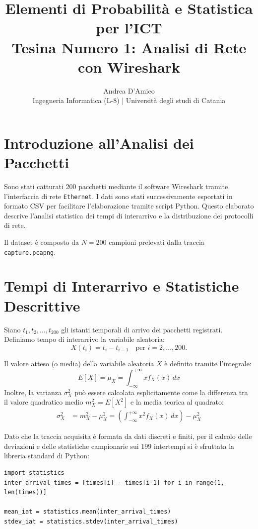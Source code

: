 \documentclass[11pt,a4paper]{article}
\title{
    \textbf{Elementi di Probabilità e Statistica per l'ICT \\
    Tesina Numero 1: Analisi di Rete con Wireshark
}}
\author{Andrea D'Amico \\ \small{Ingegneria Informatica (L-8) | Università degli studi di Catania}}
\date{}
\begin{document}
\maketitle

\tableofcontents

\section{Introduzione all'Analisi dei Pacchetti}
Sono stati catturati 200 pacchetti mediante il software Wireshark tramite l'interfaccia di rete \texttt{Ethernet}. I dati sono stati successivamente esportati in formato CSV per facilitare l'elaborazione tramite script Python. Questo elaborato descrive l'analisi statistica dei tempi di interarrivo e la distribuzione dei protocolli di rete.

Il dataset è composto da $N=200$ campioni prelevati dalla traccia \texttt{capture.pcapng}.

\section{Tempi di Interarrivo e Statistiche Descrittive}
Siano $t_1, t_2, \dots, t_{200}$ gli istanti temporali di arrivo dei pacchetti registrati. Definiamo tempo di interarrivo la variabile aleatoria:
\begin{equation}
    X(t_i) = t_i - t_{i-1} \quad \text{per } i = 2, \dots, 200.
\end{equation}

Il valore atteso (o media) della variabile aleatoria $X$ è definito tramite l'integrale:
\begin{equation}
    E[X] = \mu_X = \int_{-\infty}^{+\infty} x f_X(x) \, dx
\end{equation}
Inoltre, la varianza $\sigma_X^2$ può essere calcolata esplicitamente come la differenza tra il valore quadratico medio $m_X^2 = E[X^2]$ e la media teorica al quadrato:
\begin{align}
    \sigma_X^2 & = m_X^2 - \mu_X^2
    = \left( \int_{-\infty}^{+\infty} x^2 f_X(x) \, dx \right) - \mu_X^2
\end{align}

Dato che la traccia acquisita è formata da dati discreti e finiti, per il calcolo delle deviazioni e delle statistiche campionarie sui $199$ intertempi si è sfruttata la libreria standard di Python:
\begin{verbatim}
import statistics
inter_arrival_times = [times[i] - times[i-1] for i in range(1, len(times))]

mean_iat = statistics.mean(inter_arrival_times)
stdev_iat = statistics.stdev(inter_arrival_times)
\end{verbatim}
\end{document}
